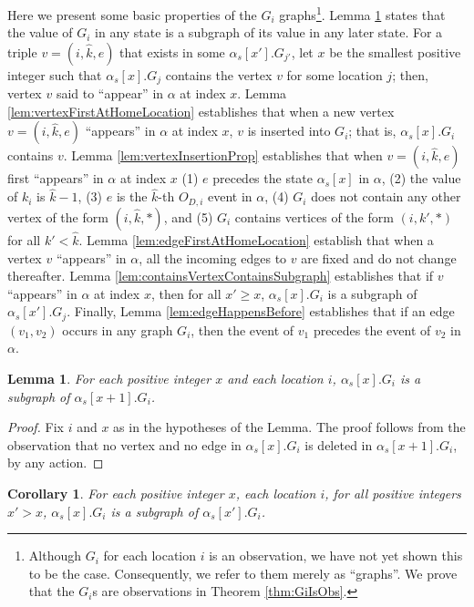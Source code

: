 \documentclass[11pt]{article}
\numberwithin{theorem}{section}
\newtheorem{lemma}[theorem]{Lemma}
\newtheorem{corollary}[theorem]{Corollary}
\begin{document}
Here we present some basic properties of the $G_i$ graphs\footnote{Although $G_i$ for each location $i$ is an observation, we have not yet shown this to be the case. Consequently, we refer to them merely as ``graphs''. We prove that the $G_i$s are observations in Theorem \ref{thm:GiIsObs}.}.
Lemma \ref{prop:subgraphNext} states that the value of $G_i$ in any state is a subgraph of its value in any later state.
For a triple $v = (i,\hat{k},e)$ that exists in some $\alpha_s[x'].G_{j'}$, let $x$ be the smallest positive integer such that $\alpha_s[x].G_j$ contains the vertex $v$ for some location $j$; then, vertex $v$ said to ``appear'' in $\alpha$ at index $x$.
Lemma \ref{lem:vertexFirstAtHomeLocation} establishes that when a new vertex $v = (i,\hat{k},e)$ ``appears'' in $\alpha$ at index $x$, $v$ is inserted into $G_i$; that is, $\alpha_s[x].G_i$ contains $v$. 
Lemma \ref{lem:vertexInsertionProp} establishes that  when $v = (i,\hat{k},e)$ first ``appears'' in $\alpha$ at index $x$ (1) $e$ precedes the state $\alpha_s[x]$ in $\alpha$, (2) the value of $k_i$ is $\hat{k} -1$, (3) $e$ is the $\hat{k}$-th $O_{D,i}$ event in $\alpha$, (4) $G_i$ does not contain any other vertex of the form $(i,\hat{k},*)$, and (5) $G_i$ contains vertices of the form $(i,k',*)$ for all $k' < \hat{k}$. Lemma \ref{lem:edgeFirstAtHomeLocation} establish that when a vertex $v$ ``appears'' in $\alpha$, all the incoming edges to $v$ are fixed and do not change thereafter. Lemma \ref{lem:containsVertexContainsSubgraph} establishes that if $v$ ``appears'' in $\alpha$ at index $x$, then for all $x' \geq x$, $\alpha_s[x].G_i$ is a subgraph of $\alpha_s[x'].G_j$. Finally, Lemma \ref{lem:edgeHappensBefore} establishes that if an edge $(v_1,v_2)$ occurs in any graph $G_i$, then the event of $v_1$ precedes the event of $v_2$ in $\alpha$.

\begin{lemma}
\label{prop:subgraphNext}
For each positive integer $x$ and each location $i$, $\alpha_s[x].G_i$ is a subgraph of $\alpha_s[x+1].G_i$.
\end{lemma}  

\begin{proof}
Fix $i$ and $x$ as in the hypotheses of the Lemma. The proof follows from the observation that no vertex and no edge in $\alpha_s[x].G_i$ is deleted in $\alpha_s[x+1].G_i$, by any action.
\end{proof}
\begin{corollary}\label{cor:subgraphFuture}
For each positive integer $x$, each location $i$, for all positive integers $x'>x$, $\alpha_s[x].G_i$ is a subgraph of $\alpha_s[x'].G_i$.
\end{corollary}
\end{document}
